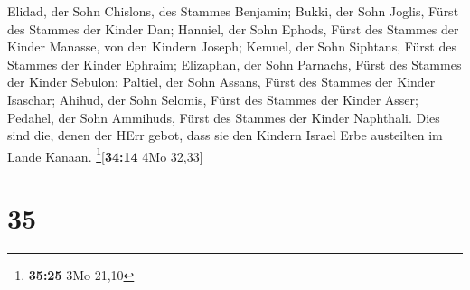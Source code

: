 Elidad, der Sohn Chislons, des Stammes Benjamin;
 Bukki, der Sohn Joglis, Fürst des Stammes der Kinder
Dan;  Hanniel, der Sohn Ephods, Fürst des Stammes der
Kinder Manasse, von den Kindern Joseph;  Kemuel, der Sohn
Siphtans, Fürst des Stammes der Kinder Ephraim; 
Elizaphan, der Sohn Parnachs, Fürst des Stammes der Kinder Sebulon;
 Paltiel, der Sohn Assans, Fürst des Stammes der Kinder
Isaschar;  Ahihud, der Sohn Selomis, Fürst des Stammes
der Kinder Asser;  Pedahel, der Sohn Ammihuds, Fürst des
Stammes der Kinder Naphthali.  Dies sind die, denen der
HErr gebot, dass sie den Kindern Israel Erbe austeilten im Lande Kanaan.
\footnote{\textbf{35:25} 3Mo 21,10}{[}\textbf{34:14} 4Mo 32,33{]}

\hypertarget{section-34}{%
\section{35}\label{section-34}}

